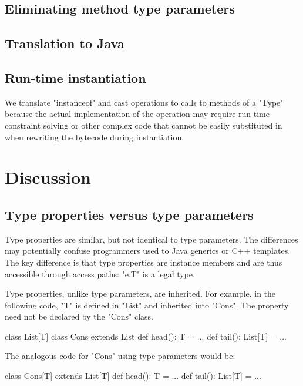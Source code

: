 \documentclass[preprint,nocopyrightspace,9pt]{sigplanconf}
\begin{document}
\subsection{Eliminating method type parameters}

\subsection{Translation to Java}

\subsection{Run-time instantiation}

We translate \xcd"instanceof" and cast operations to calls to
methods of a \xcd"Type" because the actual implementation of
the operation may require run-time constraint solving or other
complex code that cannot be easily substituted in when rewriting
the bytecode during instantiation.

\section{Discussion}
\label{sec:discussion}


\subsection{Type properties versus type parameters}


Type properties are similar, but not identical to type parameters.  The
differences may potentially confuse programmers used to Java generics or C++
templates.  The key difference is that type properties are instance members and
are thus accessible through access paths: \xcd"e.T" is a legal type.

Type properties, unlike type parameters, are inherited.
For example, in the following code, \xcd"T" is defined in \xcd"List"
and inherited into \xcd"Cons".  The property need not be
declared by the \xcd"Cons" class.
\begin{xten}
class List[T] { }
class Cons extends List {
    def head(): T = { ... }
    def tail(): List[T] = { ... }
}
\end{xten}
The analogous code for \xcd"Cons" using type parameters would be:
\begin{xten}
class Cons[T] extends List[T] {
    def head(): T = { ... }
    def tail(): List[T] = { ... }
}
\end{xten}
\end{document}
